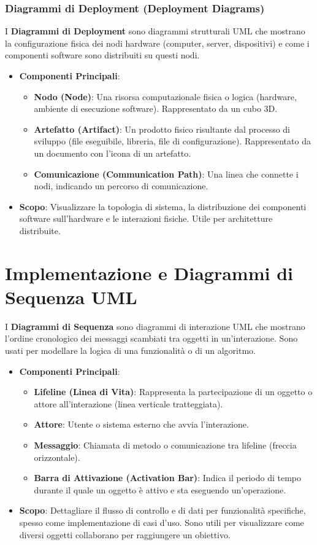 \subsubsection{Diagrammi di Deployment (Deployment Diagrams)}
I \textbf{Diagrammi di Deployment} sono diagrammi strutturali UML che mostrano la configurazione fisica dei nodi hardware (computer, server, dispositivi) e come i componenti software sono distribuiti su questi nodi.
\begin{itemize}
    \item \textbf{Componenti Principali}:
    \begin{itemize}
        \item \textbf{Nodo (Node)}: Una risorsa computazionale fisica o logica (hardware, ambiente di esecuzione software). Rappresentato da un cubo 3D.
        \item \textbf{Artefatto (Artifact)}: Un prodotto fisico risultante dal processo di sviluppo (file eseguibile, libreria, file di configurazione). Rappresentato da un documento con l'icona di un artefatto.
        \item \textbf{Comunicazione (Communication Path)}: Una linea che connette i nodi, indicando un percorso di comunicazione.
    \end{itemize}
    \item \textbf{Scopo}: Visualizzare la topologia di sistema, la distribuzione dei componenti software sull'hardware e le interazioni fisiche. Utile per architetture distribuite.
\end{itemize}

\section{Implementazione e Diagrammi di Sequenza UML}
I \textbf{Diagrammi di Sequenza} sono diagrammi di interazione UML che mostrano l'ordine cronologico dei messaggi scambiati tra oggetti in un'interazione. Sono usati per modellare la logica di una funzionalità o di un algoritmo.
\begin{itemize}
    \item \textbf{Componenti Principali}:
    \begin{itemize}
        \item \textbf{Lifeline (Linea di Vita)}: Rappresenta la partecipazione di un oggetto o attore all'interazione (linea verticale tratteggiata).
        \item \textbf{Attore}: Utente o sistema esterno che avvia l'interazione.
        \item \textbf{Messaggio}: Chiamata di metodo o comunicazione tra lifeline (freccia orizzontale).
        \item \textbf{Barra di Attivazione (Activation Bar)}: Indica il periodo di tempo durante il quale un oggetto è attivo e sta eseguendo un'operazione.
    \end{itemize}
    \item \textbf{Scopo}: Dettagliare il flusso di controllo e di dati per funzionalità specifiche, spesso come implementazione di casi d'uso. Sono utili per visualizzare come diversi oggetti collaborano per raggiungere un obiettivo.
\end{itemize}